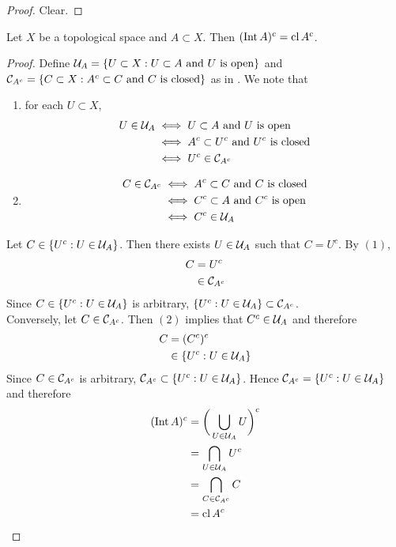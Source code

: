 \documentclass{book}
\begin{document}
	\begin{proof}
	Clear.
	\end{proof}
	
	\begin{ex} 
	Let $X$ be a topological space and $A \subset X$. Then $( \operatorname{Int} A )^c = \operatorname{cl} A^c $.
	\end{ex}	
	
	\begin{proof}
	Define  $\mathcal{U}_A = \{U \subset X:U \subset A \text{ and $U$ is open}\}$ and $\mathcal{C}_{A^c} = \{C \subset X: A^c \subset C \text{ and $C$ is closed}\}$ as in . 
	We note that 
	\begin{enumerate}
		\item for each $U \subset X$,
		\begin{align*}
			U \in \mathcal{U}_A
			& \iff U \subset A \text{ and } U \text{ is open} \\
			& \iff A^c \subset U^c \text{ and } U^c \text{ is closed} \\
			& \iff  U^c \in \mathcal{C}_{A^c}
		\end{align*}
		\item
		\begin{align*}
			C \in \mathcal{C}_{A^c}
			& \iff A^c \subset C \text{ and } C \text{ is closed} \\
			& \iff C^c \subset A \text{ and } C^c \text{ is open} \\
			& \iff  C^c \in \mathcal{U}_A
		\end{align*} 
	\end{enumerate}
	Let $C \in \{U^c: U \in \mathcal{U}_A\}$. Then there exists $U \in \mathcal{U}_A$ such that $C = U^c$. By $(1)$,  
	\begin{align*}
		C 
		& = U^c \\
		& \in \mathcal{C}_{A^c}
	\end{align*}
	Since $C \in \{U^c: U \in \mathcal{U}_A\}$ is arbitrary, $\{U^c: U \in \mathcal{U}_A\} \subset \mathcal{C}_{A^c}$. \\
	Conversely, let $C \in \mathcal{C}_{A^c}$. Then $(2)$ implies that $C^c \in \mathcal{U}_A$ and therefore 
	\begin{align*}
		C
		& = (C^c)^c \\
		& \in \{U^c: U \in \mathcal{U}_A\}
	\end{align*} 
	Since $C \in \mathcal{C}_{A^c}$ is arbitrary, $\mathcal{C}_{A^c} \subset \{U^c: U \in \mathcal{U}_A\}$. Hence $\mathcal{C}_{A^c} = \{U^c: U \in \mathcal{U}_A\}$ and therefore
	\begin{align*}
		(\operatorname{Int} A)^c 
		& = \bigg( \bigcup_{U \in \mathcal{U}_{A}} U \bigg)^c \\
		& = \bigcap_{U \in \mathcal{U}_A} U^c \\
		& = \bigcap_{C \in \mathcal{C}_{A^c}} C \\
		& = \operatorname{cl} A^c
	\end{align*}
	\end{proof}
\end{document}
